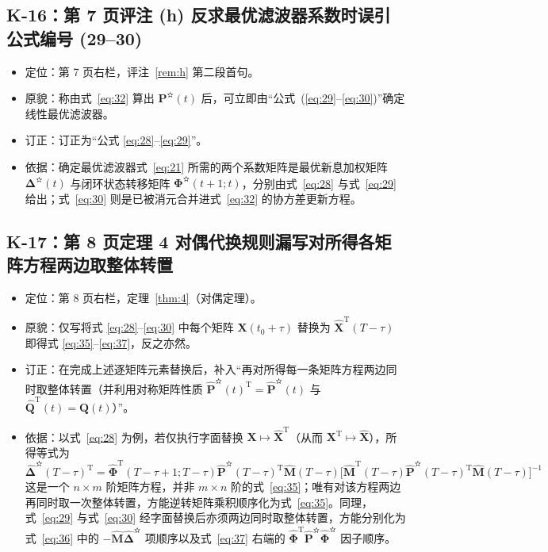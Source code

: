 \subsection{K-16：第 7 页评注 (h) 反求最优滤波器系数时误引公式编号 (29–30)}\label{sec:k16}

\begin{itemize}
\item 定位：第 7 页右栏，评注~\ref{rem:h} 第二段首句。
\item 原貌：称由式~\eqref{eq:32} 算出 $\bm{P}^{\text{✫}}(t)$ 后，可立即由“公式~(\ref{eq:29}–\ref{eq:30})”确定线性最优滤波器。
\item 订正：订正为“公式 \eqref{eq:28}–\eqref{eq:29}”。
\item 依据：确定最优滤波器式~\eqref{eq:21} 所需的两个系数矩阵是最优新息加权矩阵 $\bm{\Delta}^{\text{✫}}(t)$ 与闭环状态转移矩阵 $\bm{\Phi}^{\text{✫}}(t + 1; t)$，分别由式~\eqref{eq:28} 与式~\eqref{eq:29} 给出；式~\eqref{eq:30} 则是已被消元合并进式~\eqref{eq:32} 的协方差更新方程。
\end{itemize}

\subsection{K-17：第 8 页定理 4 对偶代换规则漏写对所得各矩阵方程两边取整体转置}\label{sec:k17}

\begin{itemize}
\item 定位：第 8 页右栏，定理~\ref{thm:4}（对偶定理）。
\item 原貌：仅写将式 \eqref{eq:28}–\eqref{eq:30} 中每个矩阵 $\bm{X}(t_0 + \tau)$ 替换为 $\hat{\bm{X}}^{\mathrm{T}}(T - \tau)$ 即得式 \eqref{eq:35}–\eqref{eq:37}，反之亦然。
\item 订正：在完成上述逐矩阵元素替换后，补入“再对所得每一条矩阵方程两边同时取整体转置（并利用对称矩阵性质 $\hat{\bm{P}}^{\text{✫}}(t)^{\mathrm{T}} = \hat{\bm{P}}^{\text{✫}}(t)$ 与 $\hat{\bm{Q}}^{\mathrm{T}}(t) = \hat{\bm{Q}}(t)$）”。
\item 依据：以式~\eqref{eq:28} 为例，若仅执行字面替换 $\bm{X} \mapsto \hat{\bm{X}}^{\mathrm{T}}$（从而 $\bm{X}^{\mathrm{T}} \mapsto \hat{\bm{X}}$），所得等式为
\begin{equation*}
\hat{\bm{\Delta}}^{\text{✫}}(T - \tau)^{\mathrm{T}} = \hat{\bm{\Phi}}^{\mathrm{T}}(T - \tau + 1; T - \tau)\hat{\bm{P}}^{\text{✫}}(T - \tau)^{\mathrm{T}}\hat{\bm{M}}(T - \tau)\bigl[\hat{\bm{M}}^{\mathrm{T}}(T - \tau)\hat{\bm{P}}^{\text{✫}}(T - \tau)^{\mathrm{T}}\hat{\bm{M}}(T - \tau)\bigr]^{-1}
\end{equation*}
这是一个 $n \times m$ 阶矩阵方程，并非 $m \times n$ 阶的式~\eqref{eq:35}；唯有对该方程两边再同时取一次整体转置，方能逆转矩阵乘积顺序化为式~\eqref{eq:35}。同理，式~\eqref{eq:29} 与式~\eqref{eq:30} 经字面替换后亦须两边同时取整体转置，方能分别化为式~\eqref{eq:36} 中的 $-\hat{\bm{M}}\hat{\bm{\Delta}}^{\text{✫}}$ 项顺序以及式~\eqref{eq:37} 右端的 $\hat{\bm{\Phi}}^{\mathrm{T}}\hat{\bm{P}}^{\text{✫}}\hat{\bm{\Phi}}^{\text{✫}}$ 因子顺序。
\end{itemize}

